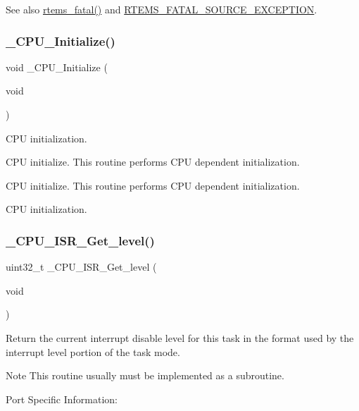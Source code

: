 \begin{DoxySeeAlso}{See also}
\mbox{\hyperlink{group__ClassicFatal_ga53fa9338246642e0d931f61314c6609e}{rtems\+\_\+fatal()}} and \mbox{\hyperlink{group__RTEMSScoreIntErr_gga878b4de77df7d0b83d19609d4de42c26a131fe6aad46a1394f8bb0f2a5f19fa05}{R\+T\+E\+M\+S\+\_\+\+F\+A\+T\+A\+L\+\_\+\+S\+O\+U\+R\+C\+E\+\_\+\+E\+X\+C\+E\+P\+T\+I\+ON}}. 
\end{DoxySeeAlso}
\mbox{\label{group__RTEMSScoreCPUMIPS_ga869484e3d851b032fd826c69ff21fc72}} 
\subsubsection{\texorpdfstring{\_CPU\_Initialize()}{\_CPU\_Initialize()}}
{\footnotesize\ttfamily void \+\_\+\+C\+P\+U\+\_\+\+Initialize (\begin{DoxyParamCaption}\item[{void}]{ }\end{DoxyParamCaption})}



C\+PU initialization. 

C\+PU initialize. This routine performs C\+PU dependent initialization.

C\+PU initialize. This routine performs C\+PU dependent initialization.

C\+PU initialization. \mbox{\label{group__RTEMSScoreCPUMIPS_ga1d9dcab9170d532b6634a5620385adbd}} 
\subsubsection{\texorpdfstring{\_CPU\_ISR\_Get\_level()}{\_CPU\_ISR\_Get\_level()}}
{\footnotesize\ttfamily uint32\+\_\+t \+\_\+\+C\+P\+U\+\_\+\+I\+S\+R\+\_\+\+Get\+\_\+level (\begin{DoxyParamCaption}\item[{void}]{ }\end{DoxyParamCaption})}

Return the current interrupt disable level for this task in the format used by the interrupt level portion of the task mode.

\begin{DoxyNote}{Note}
This routine usually must be implemented as a subroutine.
\end{DoxyNote}
Port Specific Information\+:

